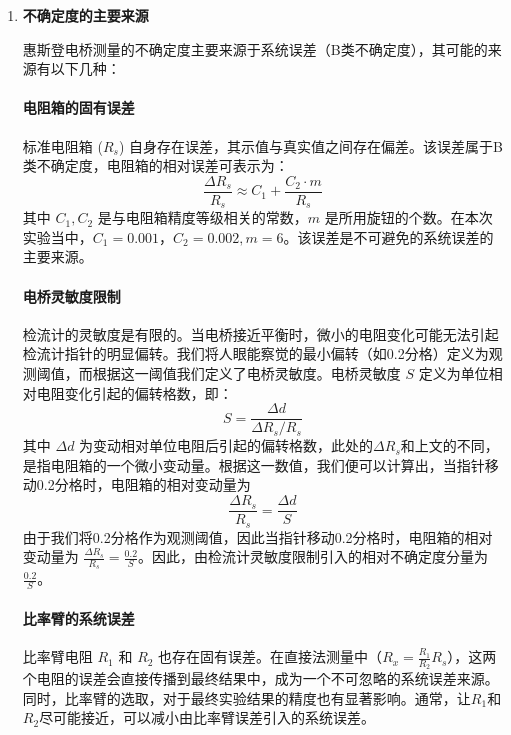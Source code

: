 \documentclass[]{../template/Report}%
\begin{document}
\begin{enumerate}[label=(\arabic*)]

\item \textbf{不确定度的主要来源}

惠斯登电桥测量的不确定度主要来源于系统误差（B类不确定度），其可能的来源有以下几种：

    \paragraph{电阻箱的固有误差}
    标准电阻箱 ($R_s$) 自身存在误差，其示值与真实值之间存在偏差。该误差属于B类不确定度，电阻箱的相对误差可表示为：
    \begin{equation}
    \frac{\Delta R_s}{R_s} \approx C_1 + \frac{C_2 \cdot m}{R_s}
    \end{equation}
    其中 $C_1, C_2$ 是与电阻箱精度等级相关的常数，$m$ 是所用旋钮的个数。在本次实验当中，$C_1=0.001$，$C_2=0.002,m=6$。该误差是不可避免的系统误差的主要来源。
    \paragraph{电桥灵敏度限制}
    检流计的灵敏度是有限的。当电桥接近平衡时，微小的电阻变化可能无法引起检流计指针的明显偏转。我们将人眼能察觉的最小偏转（如0.2分格）定义为观测阈值，而根据这一阈值我们定义了电桥灵敏度。电桥灵敏度 $S$ 定义为单位相对电阻变化引起的偏转格数，即：
    \begin{equation}
        S = \frac{\Delta d}{\Delta R_s / R_s}
    \end{equation}
    其中 $\Delta d$ 为变动相对单位电阻后引起的偏转格数，此处的$\Delta R_s$和上文的不同，是指电阻箱的一个微小变动量。根据这一数值，我们便可以计算出，当指针移动0.2分格时，电阻箱的相对变动量为 
    \begin{equation}
        \frac{\Delta R_s}{R_s} = \frac{\Delta d}{S}
    \end{equation}
    由于我们将0.2分格作为观测阈值，因此当指针移动0.2分格时，电阻箱的相对变动量为 $\frac{\Delta R_s}{R_s}=\frac{0.2}{S}$。因此，由检流计灵敏度限制引入的相对不确定度分量为 $\frac{0.2}{S}$。
    \paragraph{比率臂的系统误差}
    比率臂电阻 $R_1$ 和 $R_2$ 也存在固有误差。在直接法测量中（$R_x = \frac{R_1}{R_2}R_s$），这两个电阻的误差会直接传播到最终结果中，成为一个不可忽略的系统误差来源。同时，比率臂的选取，对于最终实验结果的精度也有显著影响。通常，让$R_1$和$R_2$尽可能接近，可以减小由比率臂误差引入的系统误差。


\end{enumerate}
\end{document}
